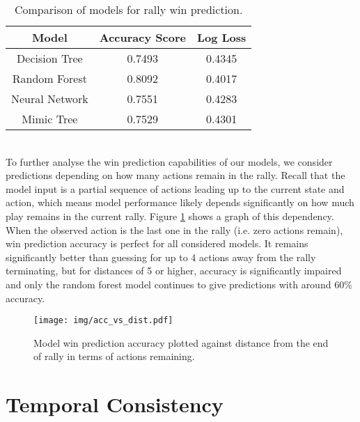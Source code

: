 \documentclass{sfuthesis}
\begin{document}
	\begin{table}
		\centering
		\begin{tabular}{c|cc}
			\textbf{Model} & \textbf{Accuracy Score} & \textbf{Log Loss} \\ \hline
			Decision Tree  & 0.7493                  & 0.4345            \\
			Random Forest  & 0.8092                  & 0.4017            \\
			Neural Network & 0.7551                  & 0.4283            \\
			Mimic Tree     & 0.7529                  & 0.4301           
		\end{tabular}
		\caption{Comparison of models for rally win prediction.}
		\label{tab:class_accuracy}
	\end{table}
	\\To further analyse the win prediction capabilities of our models, we consider predictions depending on how many actions remain in the rally. Recall that the model input is a partial sequence of actions leading up to the current state and action, which means model performance likely depends significantly on how much play remains in the current rally. Figure \ref{fig:acc-vs-dist} shows a graph of this dependency. When the observed action is the last one in the rally (i.e. zero actions remain), win prediction accuracy is perfect for all considered models. It remains significantly better than guessing for up to 4 actions away from the rally terminating, but for distances of 5 or higher, accuracy is significantly impaired and only the random forest model continues to give predictions with around 60\% accuracy.
	\begin{figure}
		\texttt{[image: img/acc\_vs\_dist.pdf]}
		\caption{Model win prediction accuracy plotted against distance from the end of rally in terms of actions remaining.}
		\label{fig:acc-vs-dist}
	\end{figure}
	
	\section{Temporal Consistency}
	
\end{document}

